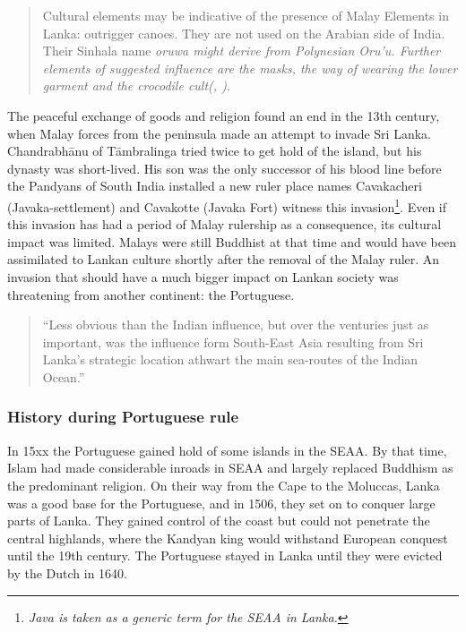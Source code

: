 \begin{quote}
    Cultural elements may be indicative of the presence of Malay Elements in Lanka: outrigger canoes. They are not used on the Arabian side of India.  Their Sinhala name \em oruwa \em might derive from  Polynesian \em Oru'u\em. Further elements of suggested influence are the masks, the way of wearing the lower garment and the crocodile cult(\citet[30f]{Hussainmiya1987}, \citet[32]{Hussainmiya1990}).
\end{quote}

The peaceful exchange of goods and religion found an end in the
13th century, when Malay forces from the peninsula made an attempt
to invade Sri Lanka. Chandrabh\=anu of T\=ambralinga tried twice
to get hold of the island, but his dynasty was short-lived. His
son was the only successor of his blood line before  the Pandyans
of South India installed a new ruler  \citep{abc} \kuckn
place names Cavakacheri (Javaka-settlement) and Cavakotte (Javaka
Fort) witness this invasion\footnote{\em Java \em is taken as a
generic term for the SEAA in Lanka.}. Even if this invasion has
had a period of Malay rulership as a consequence, its cultural
impact was limited. Malays were still Buddhist at that time and
would  have been assimilated to Lankan culture shortly after the
removal of the Malay ruler.
 An invasion that
should have a much bigger impact on Lankan society was threatening
from another continent: the Portuguese.

\begin{quote}
	``Less obvious than the Indian influence, but over the venturies just as important, was the influence form South-East Asia resulting from Sri Lanka's strategic location athwart the main sea-routes of the Indian Ocean.''\citet[4]{Desilva1981}
\end{quote}


\subsubsection{History during Portuguese rule}\label{sec:slmbg:HistoryduringPortugueserule}
In 15xx the Portuguese gained hold of some islands  \citep{abc}  in the SEAA. By that time, Islam had made considerable inroads in SEAA and largely replaced Buddhism as the predominant religion. On their way from the Cape to the Moluccas, \kuckn Lanka was a good base for the Portuguese, and in 1506,  they set on to conquer large parts of Lanka. They gained control of the coast but could not penetrate the central highlands, where the Kandyan king would withstand European conquest until the 19th century. The Portuguese stayed in Lanka until they were evicted by the Dutch in 1640.

